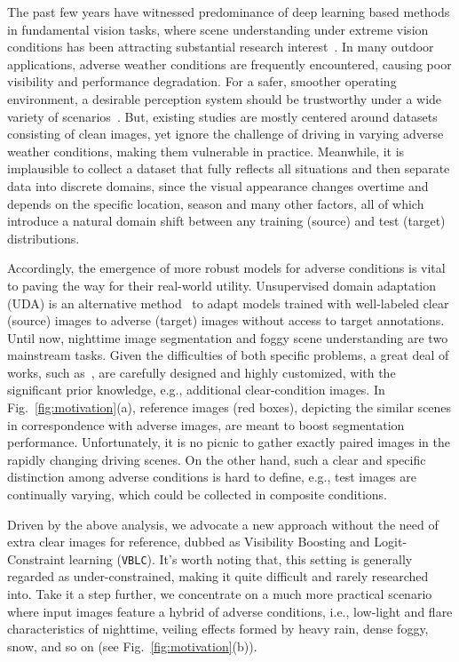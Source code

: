 \documentclass[letterpaper]{article} \usepackage{aaai23}  \usepackage{times}  \usepackage{helvet}  \usepackage{courier}  \usepackage[hyphens]{url}  \usepackage{graphicx} \urlstyle{rm} \def\UrlFont{\rm}  \usepackage{natbib}  \usepackage{caption} \frenchspacing  \setlength{\pdfpagewidth}{8.5in}  \setlength{\pdfpageheight}{11in}  \usepackage{algorithm}
\begin{document}
The past few years have witnessed predominance of deep learning based methods in fundamental vision tasks, where scene understanding under extreme vision conditions has been attracting substantial research interest~\cite{ma2022both,sakaridis2020map}. 
In many outdoor applications, adverse weather conditions are frequently encountered, causing poor visibility and performance degradation.
For a safer, smoother operating environment, a desirable perception system should be trustworthy under a wide variety of scenarios~\cite{zhang2021autonomous,sakaridis2021acdc}. But, existing studies are mostly centered around datasets consisting of clean images, yet ignore the challenge of driving in varying adverse weather conditions, making them vulnerable in practice. Meanwhile, it is implausible to collect a dataset that fully reflects all situations and then separate data into discrete domains, since the visual appearance changes overtime and depends on the specific location, season and many other factors, all of which introduce a natural domain shift between any training (source) and test (target) distributions.

Accordingly, the emergence of more robust models for adverse conditions is vital to paving the way for their real-world utility. Unsupervised domain adaptation (UDA) is an alternative method~\cite{ganin2015dann_jmlr,tzeng2017adversarial,long2018conditional,liu2020ocda,ParkWSK20,GDCAN} to adapt models trained with well-labeled clear (source) images to adverse (target) images without access to target annotations. Until now, nighttime image segmentation and foggy scene understanding are two mainstream tasks. Given the difficulties of both specific problems, a great deal of works, such as~\cite{sakaridis2020map,DaiSHG20,wu2021one,ma2022both}, are carefully designed and highly customized, with the significant prior knowledge, e.g., additional clear-condition images. In Fig.~\ref{fig:motivation}(a), reference images (red boxes), depicting the similar scenes in correspondence with adverse images, are meant to boost segmentation performance. Unfortunately, it is no picnic to gather exactly paired images in the rapidly changing driving scenes. On the other hand, such a clear and specific distinction among adverse conditions is hard to define, e.g., test images are continually varying, which could be collected in composite conditions.

Driven by the above analysis, we advocate a new approach without the need of extra clear images for reference, dubbed as Visibility Boosting and Logit-Constraint learning (\texttt{VBLC}). It's worth noting that, this setting is generally regarded as under-constrained, making it quite difficult and rarely researched into. Take it a step further, we concentrate on a much more practical scenario where input images feature a hybrid of adverse conditions, i.e., low-light and flare characteristics of nighttime, veiling effects formed by heavy rain, dense foggy, snow, and so on (see Fig.~\ref{fig:motivation}(b)). 
\end{document}
